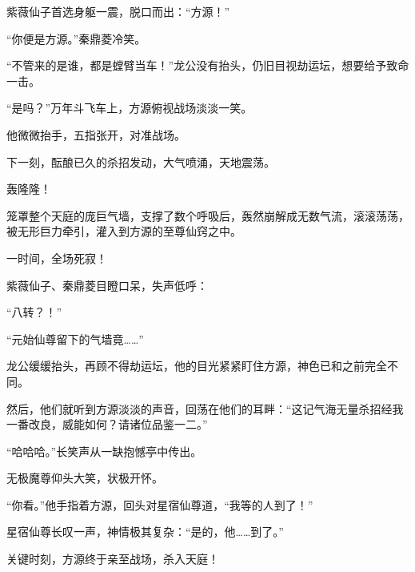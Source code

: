 \begin{this_body}
紫薇仙子首选身躯一震，脱口而出：“方源！”

“你便是方源。”秦鼎菱冷笑。

“不管来的是谁，都是螳臂当车！”龙公没有抬头，仍旧目视劫运坛，想要给予致命一击。

“是吗？”万年斗飞车上，方源俯视战场淡淡一笑。

他微微抬手，五指张开，对准战场。

下一刻，酝酿已久的杀招发动，大气喷涌，天地震荡。

轰隆隆！

笼罩整个天庭的庞巨气墙，支撑了数个呼吸后，轰然崩解成无数气流，滚滚荡荡，被无形巨力牵引，灌入到方源的至尊仙窍之中。

一时间，全场死寂！

紫薇仙子、秦鼎菱目瞪口呆，失声低呼：

“八转？！”

“元始仙尊留下的气墙竟……”

龙公缓缓抬头，再顾不得劫运坛，他的目光紧紧盯住方源，神色已和之前完全不同。

然后，他们就听到方源淡淡的声音，回荡在他们的耳畔：“这记气海无量杀招经我一番改良，威能如何？请诸位品鉴一二。”

“哈哈哈。”长笑声从一缺抱憾亭中传出。

无极魔尊仰头大笑，状极开怀。

“你看。”他手指着方源，回头对星宿仙尊道，“我等的人到了！”

星宿仙尊长叹一声，神情极其复杂：“是的，他……到了。”

关键时刻，方源终于亲至战场，杀入天庭！

\end{this_body}

